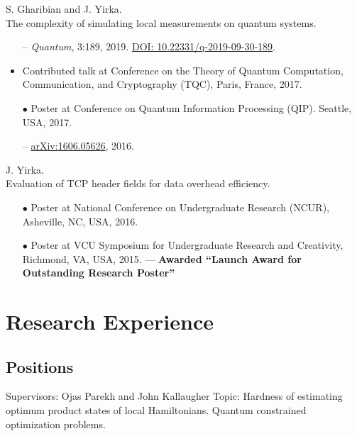 \documentclass[11pt,letterpaper,serif]{moderncv}
\newcommand{\pubItemSep}{0em}
\begin{document}
S. Gharibian and J. Yirka.
\\The complexity of simulating local measurements on quantum systems.
\begin{adjustwidth}{.1in}{}
	\begin{itemize}[itemsep=\pubItemSep]
		\item[--] \textit{Quantum}, 3:189, 2019. \href{https://doi.org/10.22331/q-2019-09-30-189}{DOI: 10.22331/q-2019-09-30-189}.
		\item Contributed talk at Conference on the Theory of Quantum Computation, Communication,
		and Cryptography (TQC), Paris, France, 2017.
		\item[$\bullet$] Poster at Conference on Quantum Information Processing (QIP). Seattle, USA, 2017.
		\item[--] \href{https://arxiv.org/abs/1606.05626}{arXiv:1606.05626}, 2016.
	\end{itemize}
\end{adjustwidth}
\vspace{\parsep}

J. Yirka.
\\Evaluation of TCP header fields for data overhead efficiency.
\begin{adjustwidth}{.1in}{}
	\begin{itemize}[itemsep=\pubItemSep]
		\item[$\bullet$] Poster at National Conference on Undergraduate Research (NCUR), Asheville, NC, USA, 2016.
		\item[$\bullet$] Poster at VCU Symposium for Undergraduate Research and Creativity, Richmond, VA, USA, 2015. --- \textbf{Awarded ``Launch Award for Outstanding Research Poster''}
	\end{itemize}
\end{adjustwidth}


\section{Research Experience}
\subsection{Positions}
{
	\begin{adjustwidth}{.25in}{}
		Supervisors: Ojas Parekh and John Kallaugher \newline
		Topic: Hardness of estimating optimum product states of local Hamiltonians. Quantum constrained optimization problems.
	\end{adjustwidth}
}
\end{document}
